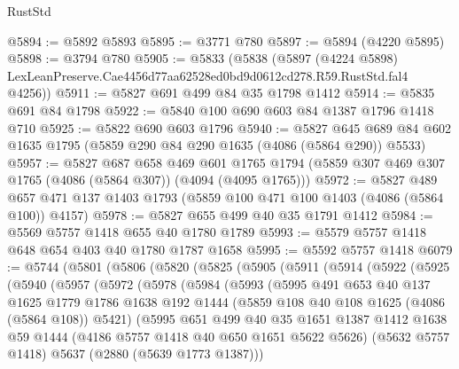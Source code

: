 \begin{lexlean}{RustStd}
\begin{coremodule}
@5894 := @5892 @5893
@5895 := @3771 @780
@5897 := @5894 (@4220 @5895)
@5898 := @3794 @780
@5905 := @5833
    (@5838
      (@5897
        (@4224 @5898)
        LexLeanPreserve.Cae4456d77aa62528ed0bd9d0612cd278.R59.RustStd.fal4
        @4256))
@5911 := @5827 @691 @499 @84 @35 @1798 @1412
@5914 := @5835 @691 @84 @1798
@5922 := @5840 @100 @690 @603 @84 @1387 @1796 @1418 @710
@5925 := @5822 @690 @603 @1796
@5940 := @5827 @645 @689 @84 @602 @1635 @1795 (@5859 @290 @84 @290 @1635 (@4086 (@5864 @290)) @5533)
@5957 := @5827
    @687
    @658
    @469
    @601
    @1765
    @1794
    (@5859 @307 @469 @307 @1765 (@4086 (@5864 @307)) (@4094 (@4095 @1765)))
@5972 := @5827
    @489
    @657
    @471
    @137
    @1403
    @1793
    (@5859 @100 @471 @100 @1403 (@4086 (@5864 @100)) @4157)
@5978 := @5827 @655 @499 @40 @35 @1791 @1412
@5984 := @5569 @5757 @1418 @655 @40 @1780 @1789
@5993 := @5579 @5757 @1418 @648 @654 @403 @40 @1780 @1787 @1658
@5995 := @5592 @5757 @1418
@6079 := @5744
    (@5801
      (@5806
        (@5820
          (@5825
            (@5905
              (@5911
                (@5914
                  (@5922
                    (@5925
                      (@5940
                        (@5957
                          (@5972
                            (@5978
                              (@5984
                                (@5993
                                  (@5995
                                    @491
                                    @653
                                    @40
                                    @137
                                    @1625
                                    @1779
                                    @1786
                                    @1638
                                    @192
                                    @1444
                                    (@5859 @108 @40 @108 @1625 (@4086 (@5864 @108)) @5421)
                                    (@5995
                                      @651
                                      @499
                                      @40
                                      @35
                                      @1651
                                      @1387
                                      @1412
                                      @1638
                                      @59
                                      @1444
                                      (@4186 @5757 @1418 @40 @650 @1651 @5622 @5626)
                                      (@5632 @5757 @1418)
                                      @5637
                                      (@2880 (@5639 @1773 @1387)))

\end{coremodule}
\end{lexlean}
